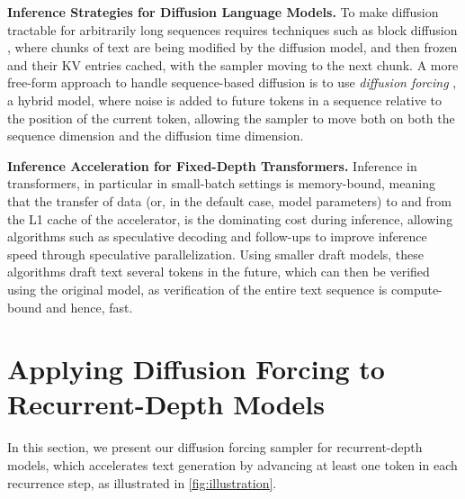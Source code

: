 \documentclass{article} %
\theoremstyle{definition}
\theoremstyle{plain}
\begin{document}

\textbf{Inference Strategies for Diffusion Language Models.}
To make diffusion tractable for arbitrarily long sequences requires techniques such as block diffusion \citep{arriola_block_2025}, where chunks of text are being modified by the diffusion model, and then frozen and their KV entries cached, with the sampler moving to the next chunk. A more free-form approach to handle sequence-based diffusion is to use \textit{diffusion forcing} \citep{chen_diffusion_2024-1}, a hybrid model, where noise is added to future tokens in a sequence relative to the position of the current token, allowing the sampler to move both on both the sequence dimension and the diffusion time dimension. 


\textbf{Inference Acceleration for Fixed-Depth Transformers.}
Inference in transformers, in particular in small-batch settings is memory-bound, meaning that the transfer of data (or, in the default case, model parameters) to and from the L1 cache of the accelerator, is the dominating cost during inference, allowing algorithms such as speculative decoding \citep{leviathan_fast_2023} and follow-ups \citep{cai_medusa_2024,miao2024specinfer,chen2024sequoia} to improve inference speed through speculative parallelization. Using smaller draft models, these algorithms draft text several tokens in the future, which can then be verified using the original model, as verification of the entire text sequence is compute-bound and hence, fast.%




\section{Applying Diffusion Forcing to Recurrent-Depth Models}
In this section, we present our diffusion forcing sampler for recurrent-depth models, which accelerates text generation by advancing at least one token in each recurrence step, as illustrated in \cref{fig:illustration}.
\end{document}

